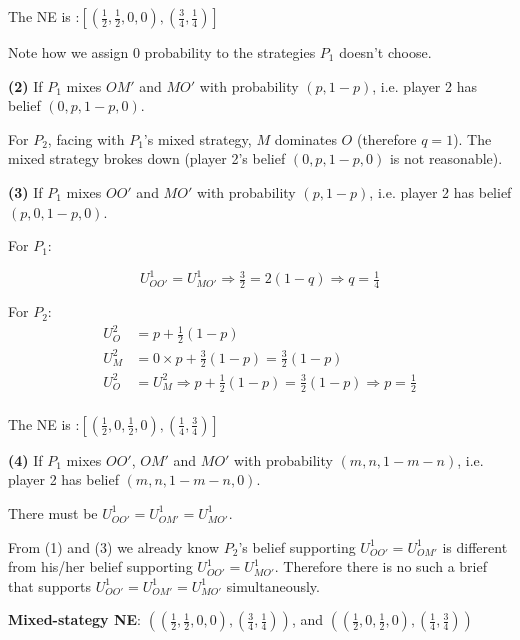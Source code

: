 \documentclass{article}
\begin{document}
The NE is :$[\left( \tfrac12, \tfrac12, 0, 0 \right), \left( \tfrac34, \tfrac14 \right)]$


\begin{mdframed}[backgroundcolor=blue!20,linecolor=white]
Note how we assign 0 probability to the strategies $P_1$ doesn't choose.
\end{mdframed}

\textbf{(2)} If $P_1$ mixes $OM'$ and $MO'$ with probability $(p,1-p)$, i.e. player 2 has belief $(0,p,1-p,0)$.

\medskip

For $P_2$, facing with $P_1$'s mixed strategy, $M$ dominates $O$ (therefore $q=1$).
The mixed strategy brokes down (player 2's belief $(0,p,1-p,0)$ is not reasonable).

\medskip

\textbf{(3)} If $P_1$ mixes $OO'$ and $MO'$ with probability $(p,1-p)$, i.e. player 2 has belief $(p,0,1-p,0)$.
\medskip

For $P_1$:

$$U^1_{OO'} = U^1_{MO'} \Rightarrow \tfrac32 =  2 (1-q)  \Rightarrow  q =\tfrac14$$

For $P_2$:
\begin{align*}
U^2_{O} &= p + \tfrac12 (1-p) \\
U^2_{M} &= 0 \times p + \tfrac32 (1-p) = \tfrac32 (1-p) \\
U^2_{O} &= U^2_{M} \Rightarrow p + \tfrac12 (1-p) = \tfrac32 (1-p) \Rightarrow p=\tfrac12 \\
\end{align*}


The NE is :$[\left( \tfrac12, 0, \tfrac12, 0 \right), \left( \tfrac14, \tfrac34 \right)]$

\medskip

\textbf{(4)} If $P_1$ mixes $OO'$, $OM'$ and $MO'$ with probability $(m,n,1-m-n)$, i.e. player 2 has belief $(m,n,1-m-n,0)$.
\medskip

There must be $U^1_{OO'} = U^1_{OM'} = U^1_{MO'}$.

From (1) and (3) we already know 
$P_2$'s belief supporting $U^1_{OO'} = U^1_{OM'}$ is different from his/her belief supporting
$U^1_{OO'} = U^1_{MO'}$. Therefore there is no such a brief that supports
$U^1_{OO'} = U^1_{OM'} = U^1_{MO'}$ simultaneously.

\medskip

\textbf{Mixed-stategy NE}: $\left( \left( \tfrac12, \tfrac12, 0, 0 \right), \left( \tfrac34, \tfrac14 \right) \right)$, and $\left( \left( \tfrac12, 0, \tfrac12, 0 \right), \left( \tfrac14, \tfrac34 \right) \right)$
\end{document}
